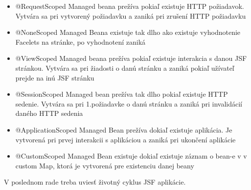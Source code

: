 \begin{itemize}
\item @RequestScoped Managed beana prežíva pokiaľ  existuje HTTP požiadavok. Vytvára sa pri vytvorený požiadavku a zaniká pri zrušení HTTP požiadavku
\item @NoneScoped Managed Beana existuje tak dlho ako existuje vyhodnotenie Facelets na stránke, po vyhodnotení zaniká
\item @ViewScoped Managed beana prežíva pokiaľ existuje interakcia s danou JSF stránkou. Vytvára sa pri žiadosti o danú stránku a zaniká pokiaľ užívateľ prejde na inú JSF stránku
\item @SessionScoped Managed bean prežíva tak dlho pokiaľ existuje HTTP sedenie. Vytvára sa pri 1.požiadavke o danú stránku a zaniká pri invalidácií daného HTTP sedenia
\item @ApplicationScoped Managed Bean prežíva dokiaľ existuje aplikácia. Je vytvorená pri prvej interakcii s aplikáciou a zaniká pri ukončení aplikácie
\item @CustomScoped Managed Bean existuje dokiaľ existuje záznam o bean-e v v custom Map, ktorá je vytvorená pre existenciu danej beany
\end{itemize}
V poslednom rade treba uviesť životný cyklus JSF aplikácie.

